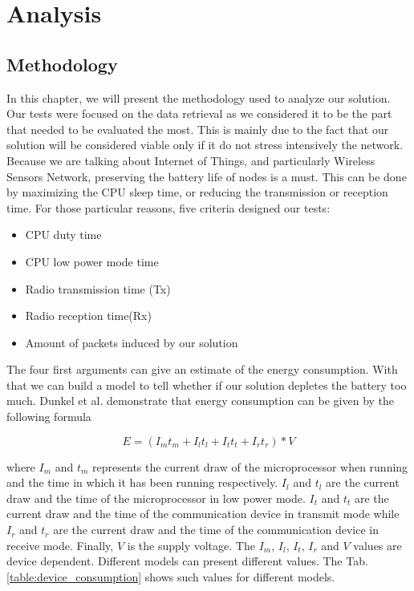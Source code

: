 \part{Analysis}  \label{part:analysis}

\chapter{Methodology}

In this chapter, we will present the methodology used to analyze our solution. Our tests were focused on the data retrieval as we considered it to be the part that needed to be evaluated the most. This is mainly due to the fact that our solution will be considered viable only if it do not stress intensively the network. Because we are talking about Internet of Things, and particularly Wireless Sensors Network, preserving the battery life of nodes is a must. This can be done by maximizing the CPU sleep time, or reducing the transmission or reception time. For those particular reasons, five criteria designed our tests:

\begin{itemize}
  \item CPU duty time
  \item CPU low power mode time
  \item Radio transmission time (Tx)
  \item Radio reception time(Rx)
  \item Amount of packets induced by our solution \\
\end{itemize}

The four first arguments can give an estimate of the energy consumption. With that we can build a model to tell whether if our solution depletes the battery too much. Dunkel et al. \cite{dunkels2007software} demonstrate that energy consumption can be given by the following formula

\begin{equation}
  E = (I_m t_m + I_l t_l + I_t t_t + I_r t_r) * V
\end{equation}

where $I_m$ and $t_m$ represents the current draw of the microprocessor when running and the time in which it has been running respectively. $I_l$ and $t_l$  are the current draw and the time of the microprocessor in low power mode. $I_t$ and $t_t$ are the current draw and the time of the communication device in transmit mode while $I_r$ and $t_r$ are the current draw and the time of the communication device in receive mode. Finally, $V$ is the supply voltage. The $I_m$, $I_l$, $I_t$, $I_r$ and $V$ values are device dependent. Different models can present different values. The Tab.\ref{table:device_consumption} shows such values for different models.\\

